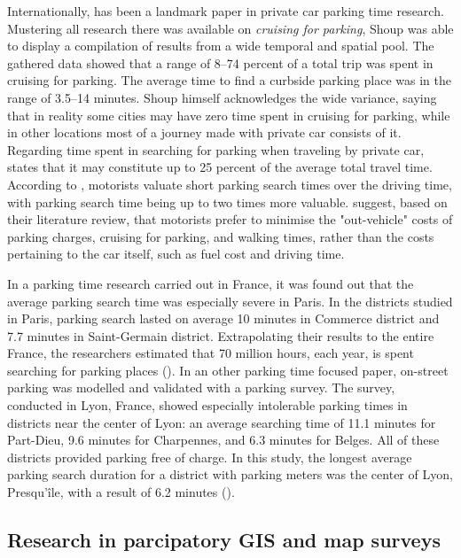 Internationally,  has been a landmark paper in private car parking time research. Mustering all research there was available on \textit{cruising for parking}, Shoup was able to display a compilation of results from a wide temporal and spatial pool. The gathered data showed that a range of 8--74 percent of a total trip was spent in cruising for parking. The average time to find a curbside parking place was in the range of 3.5--14 minutes. Shoup himself acknowledges the wide variance, saying that in reality some cities may have zero time spent in cruising for parking, while in other locations most of a journey made with private car consists of it. Regarding time spent in searching for parking when traveling by private car,  states that it may constitute up to 25 percent of the average total travel time. According to , motorists valuate short parking search times over the driving time, with parking search time being up to two times more valuable.  suggest, based on their literature review, that motorists prefer to minimise the "out-vehicle" costs of parking charges, cruising for parking, and walking times, rather than the costs pertaining to the car itself, such as fuel cost and driving time.

In a parking time research carried out in France, it was found out that the average parking search time was especially severe in Paris. In the districts studied in Paris, parking search lasted on average 10 minutes in Commerce district and 7.7 minutes in Saint-Germain district. Extrapolating their results to the entire France, the researchers estimated that 70 million hours, each year, is spent searching for parking places (\cite{Gantelet2006}). In an other parking time focused paper, on-street parking was modelled and validated with a parking survey. The survey, conducted in Lyon, France, showed especially intolerable parking times in districts near the center of Lyon: an average searching time of 11.1 minutes for Part-Dieu, 9.6 minutes for Charpennes, and 6.3 minutes for Belges. All of these districts provided parking free of charge. In this study, the longest average parking search duration for a district with parking meters was the center of Lyon, Presqu'île, with a result of 6.2 minutes (\cite{Belloche2015}).

\newpage
\subsection{Research in parcipatory GIS and map surveys}
\justify

